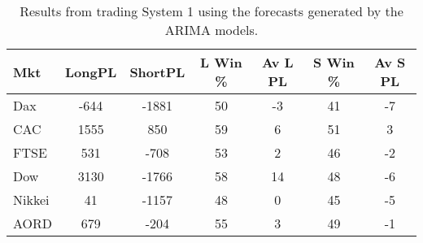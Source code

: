 \begin{table}[ht]
\centering
\caption[Results from trading System 1 using the forecasts generated by the ARIMA models]{Results from trading System 1 using the forecasts generated by the ARIMA models.} 
\label{tab:chp_ts:arima1}
\begin{tabular}{lcccccc}
  \toprule Mkt & LongPL & ShortPL & L Win \% & Av L PL & S Win \% & Av S PL \\ 
  \midrule Dax & -644 & -1881 & 50 & -3 & 41 & -7 \\ 
  CAC & 1555 & 850 & 59 & 6 & 51 & 3 \\ 
  FTSE & 531 & -708 & 53 & 2 & 46 & -2 \\ 
  Dow & 3130 & -1766 & 58 & 14 & 48 & -6 \\ 
  Nikkei & 41 & -1157 & 48 & 0 & 45 & -5 \\ 
  AORD & 679 & -204 & 55 & 3 & 49 & -1 \\ 
   \bottomrule \end{tabular}
\end{table}
